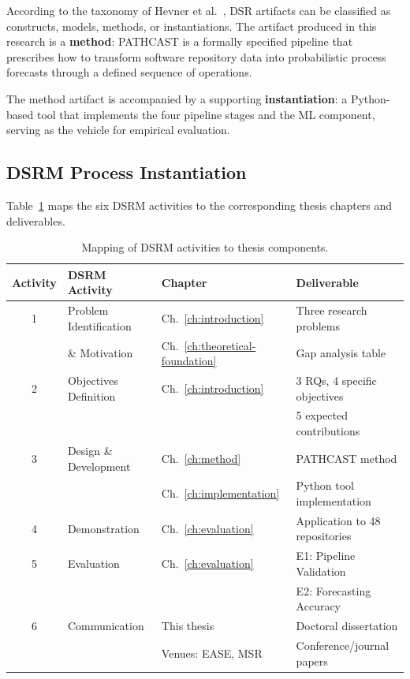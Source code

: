 According to the taxonomy of Hevner et al.~\cite{hevner2004}, DSR 
artifacts can be classified as constructs, models, methods, or 
instantiations. The artifact produced in this research is a \textbf{method}: 
PATHCAST is a formally specified pipeline that prescribes how to 
transform software repository data into probabilistic process forecasts 
through a defined sequence of operations.

The method artifact is accompanied by a supporting \textbf{instantiation}: 
a Python-based tool that implements the four pipeline stages and the ML 
component, serving as the vehicle for empirical evaluation.


\subsection{DSRM Process Instantiation}
\label{sec:dsrm-instantiation}

Table~\ref{tab:dsrm-mapping} maps the six DSRM activities to the 
corresponding thesis chapters and deliverables.

\begin{table}[htbp]
\centering
\caption{Mapping of DSRM activities to thesis components.}
\label{tab:dsrm-mapping}
\small
\begin{tabular}{clll}
\toprule
\textbf{Activity} & \textbf{DSRM Activity} & \textbf{Chapter} & \textbf{Deliverable} \\
\midrule
1 & Problem Identification & Ch.~\ref{ch:introduction} & 
    Three research problems \\
  & \& Motivation & Ch.~\ref{ch:theoretical-foundation} & 
    Gap analysis table \\
\midrule
2 & Objectives Definition & Ch.~\ref{ch:introduction} & 
    3 RQs, 4 specific objectives \\
  & & & 5 expected contributions \\
\midrule
3 & Design \& Development & Ch.~\ref{ch:method} & 
    PATHCAST method \\
  & & Ch.~\ref{ch:implementation} & 
    Python tool implementation \\
\midrule
4 & Demonstration & Ch.~\ref{ch:evaluation} & 
    Application to 48 repositories \\
\midrule
5 & Evaluation & Ch.~\ref{ch:evaluation} & 
    E1: Pipeline Validation \\
  & & & E2: Forecasting Accuracy \\
\midrule
6 & Communication & This thesis & 
    Doctoral dissertation \\
  & & Venues: EASE, MSR & 
    Conference/journal papers \\
\bottomrule
\end{tabular}
\end{table}


